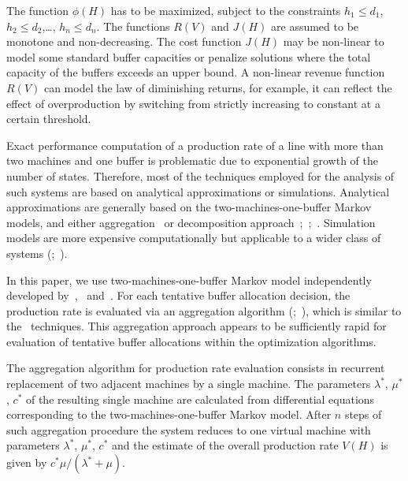\documentclass{ifacconf}
\begin{document}
The function $\phi(H)$ has to be maximized, subject to the constraints $h_1 \leq d_1$, $h_2 \leq d_2$,…, $h_n \leq d_n$.
The functions $R(V)$ and $J(H)$ are assumed to be monotone and  non-decreasing. 
The cost function $J(H)$ may be non-linear to model some standard buffer capacities or 
penalize  solutions  where  the  total  capacity  of  the  buffers  exceeds  an  upper  bound. A 
non-linear revenue function $R(V)$ can model the law of diminishing returns, for example, 
it  can  reflect  the  effect  of  overproduction  by  switching  from  strictly  increasing  to 
constant at a certain threshold. 

Exact performance computation of a production rate of a line with 
more than two machines and one buffer is problematic due to exponential growth of the 
number of states. Therefore, most of the techniques employed for the analysis of such 
systems are based on analytical approximations or simulations. Analytical 
approximations are generally based on the two-machines-one-buffer Markov models, 
and either aggregation~\cite{DeKoster87} or decomposition approach~\cite{DalXie89};~\cite{Gers87};~\cite{Li2005}. 
Simulation models are more expensive 
computationally but applicable to a wider class of systems (\cite{DS95};~\cite{SorJan2004}). 
 




In this paper, we use two-machines-one-buffer Markov model independently developed 
by~\cite{LP},~\cite{DF} and~\cite{Proth84}. For 
each tentative buffer allocation decision, the production rate is evaluated via an 
aggregation algorithm (\cite{Dolgui93};~\cite{DS95}), which is similar to the~\cite{TD87} techniques. 
This aggregation approach appears to be 
sufficiently rapid for evaluation of tentative buffer allocations within the optimization 
algorithms.  
 
The aggregation algorithm for production rate evaluation consists in recurrent 
replacement of two adjacent machines by a single machine. The parameters $\lambda^*$, $\mu^*$, $c^*$ of 
the resulting single machine are calculated from differential equations corresponding to
the two-machines-one-buffer Markov model. After $n$ steps of such aggregation 
procedure the system reduces to one virtual machine with parameters $\lambda^*$, $\mu^*$, $c^*$ and the 
estimate of the overall production rate $V(H)$ is given by $c^*\mu/(\lambda^*+\mu).$
\end{document}
